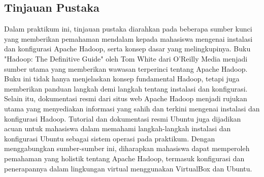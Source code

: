 \begin{multicols}{2}
\subsection{Tinjauan Pustaka}
Dalam praktikum ini, tinjauan pustaka diarahkan pada beberapa sumber kunci yang memberikan pemahaman mendalam kepada mahasiswa mengenai instalasi dan konfigurasi Apache Hadoop, serta konsep dasar yang melingkupinya. Buku "Hadoop: The Definitive Guide" oleh Tom White dari O'Reilly Media menjadi sumber utama yang memberikan wawasan terperinci tentang Apache Hadoop. Buku ini tidak hanya menjelaskan konsep fundamental Hadoop, tetapi juga memberikan panduan langkah demi langkah tentang instalasi dan konfigurasi. Selain itu, dokumentasi resmi dari situs web Apache Hadoop menjadi rujukan utama yang menyediakan informasi yang sahih dan terkini mengenai instalasi dan konfigurasi Hadoop. Tutorial dan dokumentasi resmi Ubuntu juga dijadikan acuan untuk mahasiswa dalam memahami langkah-langkah instalasi dan konfigurasi Ubuntu sebagai sistem operasi pada praktikum. Dengan menggabungkan sumber-sumber ini, diharapkan mahasiswa dapat memperoleh pemahaman yang holistik tentang Apache Hadoop, termasuk konfigurasi dan penerapannya dalam lingkungan virtual menggunakan VirtualBox dan Ubuntu.
\end{multicols}